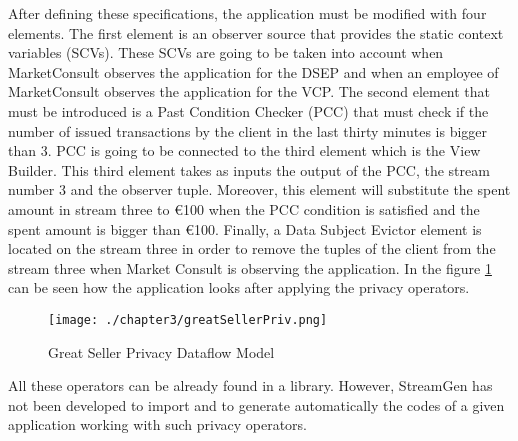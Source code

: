 After defining these specifications, the application must be modified with four elements. The first element is an observer source that provides the static context variables (SCVs). These SCVs are going to be taken into account when MarketConsult observes the application for the DSEP and when an employee of MarketConsult observes the application for the VCP. The second element that must be introduced is a Past Condition Checker (PCC) that must check if the number of issued transactions by the client in the last thirty minutes is bigger than 3. PCC is going to be connected to the third element which is the View Builder. This third element takes as inputs the output of the PCC, the stream number 3 and the observer tuple. Moreover, this element will substitute the spent amount in stream three to \euro{100} when the PCC condition is satisfied and the spent amount is bigger than \euro{100}. Finally, a Data Subject Evictor element is located on the stream three in order to remove the tuples of the client from the stream three when Market Consult is observing the application. In the figure \ref{fig:Great Seller Privacy Dataflow Model} can be seen how the application looks after applying the privacy operators.

\begin{figure}
\centering
{\texttt{[image: ./chapter3/greatSellerPriv.png]}}
\caption{Great Seller Privacy Dataflow Model}
\label{fig:Great Seller Privacy Dataflow Model}
\end{figure}

All these operators can be already found in a library. However, StreamGen has not been developed to import and to generate automatically the codes of a given application working with such privacy operators.
